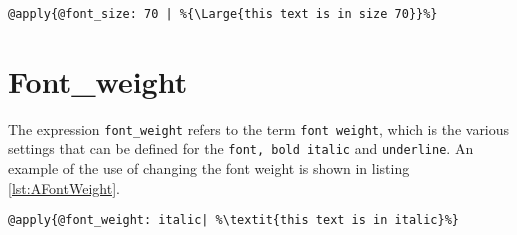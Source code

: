 \begin{lstlisting}[frame=single, caption=Changing font size, label=lst:AFontSize]
	@apply{@font_size: 70 | %{\Large{this text is in size 70}}%}
\end{lstlisting}

\section{Font\_weight}
The expression \texttt{font\_weight} refers to the term \texttt{font weight}, which is the various settings that can be defined for the \lstinline!font, bold italic! and \lstinline!underline!. An example of the use of changing the font weight is shown in listing \ref{lst:AFontWeight}.

\begin{lstlisting}[frame=single, caption=Changing font weight, label=lst:AFontWeight]
	@apply{@font_weight: italic| %\textit{this text is in italic}%}
\end{lstlisting}